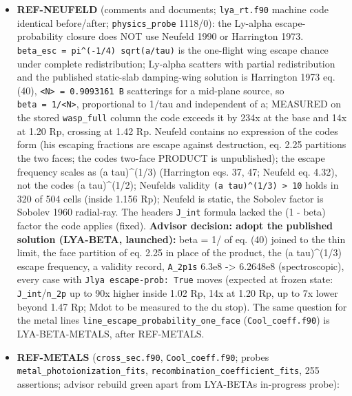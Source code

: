 \documentclass[english,a4paper]{my_memo}
\begin{document}
\begin{itemize}
  dissociative photoionization closed (the code carries it,
  \texttt{h2\_photo\_channels.f90} channel S).
\item
  \textbf{REF-NEUFELD} (comments and documents; \texttt{lya\_rt.f90} machine code
  identical before/after; \texttt{physics\_probe} 1118/0): the Ly-alpha
  escape-probability closure does NOT use Neufeld 1990 or Harrington 1973.
  \texttt{beta\_esc\ =\ pi\^{}(-1/4)\ sqrt(a/tau)} is the one-flight wing escape chance
  under complete redistribution; Ly-alpha scatters with partial
  redistribution and the published static-slab damping-wing solution is
  Harrington 1973 eq. (40), \texttt{\textless{}N\textgreater{}\ =\ 0.9093161\ B} scatterings for a mid-plane
  source, so \texttt{beta\ =\ 1/\textless{}N\textgreater{}}, proportional to 1/tau and independent of a;
  MEASURED on the stored \texttt{wasp\_full} column the code exceeds it by 234x at
  the base and 14x at 1.20 Rp, crossing at 1.42 Rp. Neufeld contains no
  expression of the code\textquotesingle s form (his escaping fractions are escape against
  destruction, eq. 2.25 partitions the two faces; the code\textquotesingle s two-face
  PRODUCT is unpublished); the escape frequency scales as (a tau)\^{}(1/3)
  (Harrington eqs. 37, 47; Neufeld eq. 4.32), not the code\textquotesingle s (a tau)\^{}(1/2);
  Neufeld\textquotesingle s validity \texttt{(a\ tau)\^{}(1/3)\ \textgreater{}\ 10} holds in 320 of 504 cells (inside
  1.156 Rp); Neufeld is static, the Sobolev factor is Sobolev 1960 radial-ray.
  The header\textquotesingle s \texttt{J\_int} formula lacked the (1 - beta) factor the code applies
  (fixed). \textbf{Advisor decision: adopt the published solution (LYA-BETA,
  launched):} beta = 1/ of eq. (40) joined to the thin limit, the face
  partition of eq. 2.25 in place of the product, the (a tau)\^{}(1/3) escape
  frequency, a validity record, \texttt{A\_2p1s} 6.3e8 -\textgreater{} 6.2648e8 (spectroscopic),
  every case with \texttt{Jlya\ escape-prob:\ True} moves (expected at frozen state:
  \texttt{J\_int}/\texttt{n\_2p} up to 90x higher inside 1.02 Rp, 14x at 1.20 Rp, up to 7x
  lower beyond 1.47 Rp; Mdot to be measured to the du stop). The same
  question for the metal lines\textquotesingle{} \texttt{line\_escape\_probability\_one\_face}
  (\texttt{Cool\_coeff.f90}) is LYA-BETA-METALS, after REF-METALS.
\item
  \textbf{REF-METALS} (\texttt{cross\_sec.f90}, \texttt{Cool\_coeff.f90}; probes
  \texttt{metal\_photoionization\_fits}, \texttt{recombination\_coefficient\_fits}, 255
  assertions; advisor rebuild green apart from LYA-BETA\textquotesingle s in-progress probe):

\end{itemize}
\end{document}
